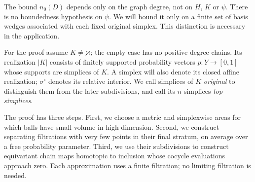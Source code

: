 The bound $n_0(D)$ depends only on the graph degree, not on $H$, $K$ or
$\psi$. There is no boundedness hypothesis on $\psi$. We will bound it
only on a finite set of basis wedges associated with each fixed original
simplex. This distinction is necessary in the application.

For the proof assume $K\ne\varnothing$; the empty case has no positive
degree chains. Its realization $|K|$ consists of finitely supported
probability vectors $p:Y\to[0,1]$ whose supports are simplices of $K$.
A simplex will also denote its closed affine realization; $\sigma^\circ$
denotes its relative interior. We call simplices of $K$ \emph{original}
to distinguish them from the later subdivisions, and call its
$n$-simplices \emph{top simplices}.

The proof has three steps. First, we choose a metric and simplexwise
areas for which balls have small volume in high dimension.
Second, we construct separating filtrations with very few points in
their final stratum, on average over a free probability parameter.
Third, we use their subdivisions to construct equivariant chain maps
homotopic to inclusion whose cocycle evaluations approach zero. Each
approximation uses a finite filtration; no limiting filtration is needed.
